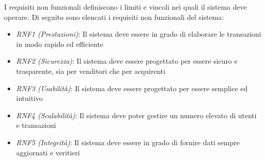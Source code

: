 I requisiti non funzionali definiscono i limiti e vincoli nei quali il sistema deve operare.
Di seguito sono elencati i requisiti non funzionali del sistema:
\begin{itemize}
    \item \textit{RNF1 (Prestazioni)}: Il sistema deve essere in grado di elaborare le transazioni in modo rapido ed efficiente
    \item \textit{RNF2 (Sicurezza)}: Il sistema deve essere progettato per essere sicuro e trasparente, sia per venditori che per acquirenti
    \item \textit{RNF3 (Usabilità)}: Il sistema deve essere progettato per essere semplice ed intuitivo
    \item \textit{RNF4 (Scalabilità)}: Il sistema deve poter gestire un numero elevato di utenti e transazioni
    \item \textit{RNF5 (Integrità)}:  Il sistema deve essere in grado di fornire dati sempre aggiornati e veritieri
\end{itemize}